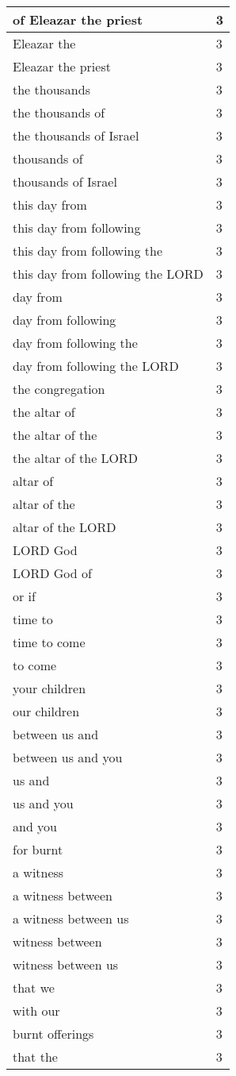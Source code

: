 \begin{center}
\begin{longtable}{|p{3.0in}|p{0.5in}|}
of Eleazar the priest & 3\\ \hline 
Eleazar the & 3\\ \hline 
Eleazar the priest & 3\\ \hline 
the thousands & 3\\ \hline 
the thousands of & 3\\ \hline 
the thousands of Israel & 3\\ \hline 
thousands of & 3\\ \hline 
thousands of Israel & 3\\ \hline 
this day from & 3\\ \hline 
this day from following & 3\\ \hline 
this day from following the & 3\\ \hline 
this day from following the LORD & 3\\ \hline 
day from & 3\\ \hline 
day from following & 3\\ \hline 
day from following the & 3\\ \hline 
day from following the LORD & 3\\ \hline 
the congregation & 3\\ \hline 
the altar of & 3\\ \hline 
the altar of the & 3\\ \hline 
the altar of the LORD & 3\\ \hline 
altar of & 3\\ \hline 
altar of the & 3\\ \hline 
altar of the LORD & 3\\ \hline 
LORD God & 3\\ \hline 
LORD God of & 3\\ \hline 
or if & 3\\ \hline 
time to & 3\\ \hline 
time to come & 3\\ \hline 
to come & 3\\ \hline 
your children & 3\\ \hline 
our children & 3\\ \hline 
between us and & 3\\ \hline 
between us and you & 3\\ \hline 
us and & 3\\ \hline 
us and you & 3\\ \hline 
and you & 3\\ \hline 
for burnt & 3\\ \hline 
a witness & 3\\ \hline 
a witness between & 3\\ \hline 
a witness between us & 3\\ \hline 
witness between & 3\\ \hline 
witness between us & 3\\ \hline 
that we & 3\\ \hline 
with our & 3\\ \hline 
burnt offerings & 3\\ \hline 
that the & 3\\ \hline 
\end{longtable}
\end{center}





